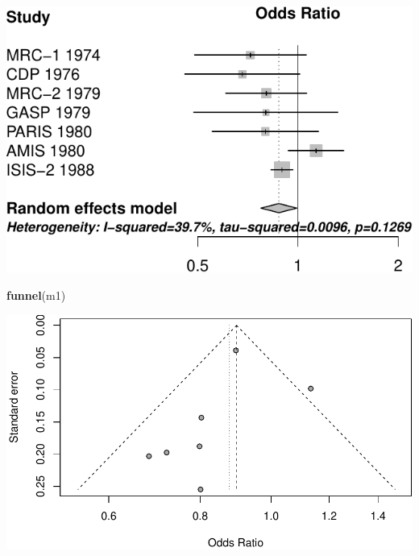 \documentclass[]{article}
\newenvironment{Shaded}{\begin{snugshade}}{\end{snugshade}}
\newcommand{\KeywordTok}[1]{\textcolor[rgb]{0.13,0.29,0.53}{\textbf{{#1}}}}
\newcommand{\NormalTok}[1]{{#1}}
\begin{document}
\includegraphics{./meta_files/figure-latex/unnamed-chunk-4.pdf}

\begin{Shaded}
\begin{Highlighting}[]
\KeywordTok{funnel}\NormalTok{(m1)}
\end{Highlighting}
\end{Shaded}

\includegraphics{./meta_files/figure-latex/unnamed-chunk-5.pdf}
\end{document}
